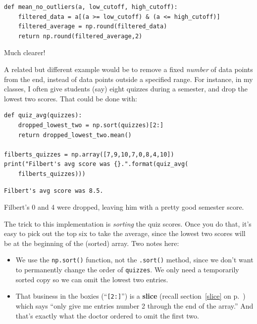 \begin{Verbatim}[fontsize=\footnotesize,samepage=true,frame=single,framesep=3mm]
def mean_no_outliers(a, low_cutoff, high_cutoff):
    filtered_data = a[(a >= low_cutoff) & (a <= high_cutoff)]
    filtered_average = np.round(filtered_data)
    return np.round(filtered_average,2)
\end{Verbatim}

Much clearer!

\medskip

A related but different example would be to remove a fixed \textit{number} of
data points from the end, instead of data points outside a specified range. For
instance, in my classes, I often give students (say) eight quizzes during a
semester, and drop the lowest two scores. That could be done with:


\begin{Verbatim}[fontsize=\footnotesize,samepage=true,frame=single,framesep=3mm]
def quiz_avg(quizzes):
    dropped_lowest_two = np.sort(quizzes)[2:]
    return dropped_lowest_two.mean()

filberts_quizzes = np.array([7,9,10,7,0,8,4,10])
print("Filbert's avg score was {}.".format(quiz_avg(
    filberts_quizzes)))
\end{Verbatim}
\vspace{-.2in}

\begin{Verbatim}[fontsize=\small,samepage=true,frame=leftline,framesep=5mm,framerule=1mm]
Filbert's avg score was 8.5.
\end{Verbatim}

Filbert's 0 and 4 were dropped, leaving him with a pretty good semester score.

The trick to this implementation is \textit{sorting} the quiz scores. Once you
do that, it's easy to pick out the top six to take the average, since the
lowest two scores will be at the beginning of the (sorted) array. Two notes
here:


\begin{itemize}[nosep]

\item We use the \texttt{np.sort()} function, not the \texttt{.sort()} method,
since we don't want to permanently change the order of \texttt{quizzes}. We
only need a temporarily sorted copy so we can omit the lowest two entries.


\item That business in the boxies (``\texttt{[2:]}'') is a \textbf{slice}
(recall section~\ref{slice} on p.~\pageref{slice}) which says ``only give me
entries number 2 through the end of the array.'' And that's exactly what the
doctor ordered to omit the first two.
\end{itemize}

